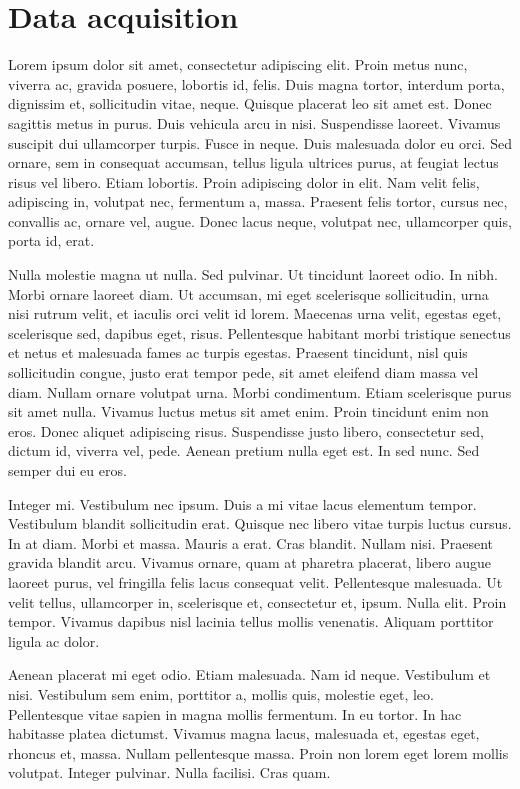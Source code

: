 \chapter{Data acquisition}

Lorem ipsum dolor sit amet, consectetur adipiscing elit. Proin metus nunc, viverra ac, gravida 
posuere, lobortis id, felis. Duis magna tortor, interdum porta, dignissim et, sollicitudin vitae, 
neque. Quisque placerat leo sit amet est. Donec sagittis metus in purus. Duis vehicula arcu in 
nisi. Suspendisse laoreet. Vivamus suscipit dui ullamcorper turpis. Fusce in neque. Duis malesuada 
dolor eu orci. Sed ornare, sem in consequat accumsan, tellus ligula ultrices purus, at feugiat 
lectus risus vel libero. Etiam lobortis. Proin adipiscing dolor in elit. Nam velit felis, 
adipiscing in, volutpat nec, fermentum a, massa. Praesent felis tortor, cursus nec, convallis ac, 
ornare vel, augue. Donec lacus neque, volutpat nec, ullamcorper quis, porta id, erat.

Nulla molestie magna ut nulla. Sed pulvinar. Ut tincidunt laoreet odio. In nibh. Morbi ornare laoreet diam. Ut accumsan, mi eget scelerisque sollicitudin, urna nisi rutrum velit, et iaculis orci velit id lorem. Maecenas urna velit, egestas eget, scelerisque sed, dapibus eget, risus. Pellentesque habitant morbi tristique senectus et netus et malesuada fames ac turpis egestas. Praesent tincidunt, nisl quis sollicitudin congue, justo erat tempor pede, sit amet eleifend diam massa vel diam. Nullam ornare volutpat urna. Morbi condimentum. Etiam scelerisque purus sit amet nulla. Vivamus luctus metus sit amet enim. Proin tincidunt enim non eros. Donec aliquet adipiscing risus. Suspendisse justo libero, consectetur sed, dictum id, viverra vel, pede. Aenean pretium nulla eget est. In sed nunc. Sed semper dui eu eros.

Integer mi. Vestibulum nec ipsum. Duis a mi vitae lacus elementum tempor. Vestibulum blandit sollicitudin erat. Quisque nec libero vitae turpis luctus cursus. In at diam. Morbi et massa. Mauris a erat. Cras blandit. Nullam nisi. Praesent gravida blandit arcu. Vivamus ornare, quam at pharetra placerat, libero augue laoreet purus, vel fringilla felis lacus consequat velit. Pellentesque malesuada. Ut velit tellus, ullamcorper in, scelerisque et, consectetur et, ipsum. Nulla elit. Proin tempor. Vivamus dapibus nisl lacinia tellus mollis venenatis. Aliquam porttitor ligula ac dolor.

Aenean placerat mi eget odio. Etiam malesuada. Nam id neque. Vestibulum et nisi. Vestibulum sem enim, porttitor a, mollis quis, molestie eget, leo. Pellentesque vitae sapien in magna mollis fermentum. In eu tortor. In hac habitasse platea dictumst. Vivamus magna lacus, malesuada et, egestas eget, rhoncus et, massa. Nullam pellentesque massa. Proin non lorem eget lorem mollis volutpat. Integer pulvinar. Nulla facilisi. Cras quam.


